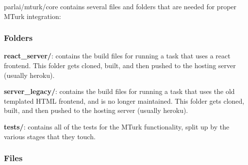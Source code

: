 {\ttfamily parlai/mturk/core} contains several files and folders that are needed for proper M\+Turk integration\+:

\subsubsection*{Folders}


\begin{DoxyItemize}
\item {\bfseries react\+\_\+server/}\+: contains the build files for running a task that uses a react frontend. This folder gets cloned, built, and then pushed to the hosting server (usually heroku).
\item {\bfseries server\+\_\+legacy/}\+: contains the build files for running a task that uses the old templated H\+T\+ML frontend, and is no longer maintained. This folder gets cloned, built, and then pushed to the hosting server (usually heroku).
\item {\bfseries tests/}\+: contains all of the tests for the M\+Turk functionality, split up by the various stages that they touch.
\end{DoxyItemize}

\subsubsection*{Files}


